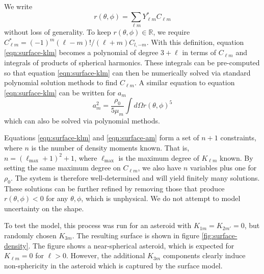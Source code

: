 \documentclass[fleqn,usenatbib]{mnras}
\begin{document}
We write 
\begin{equation}
  r(\theta, \phi) = \sum_{\ell m} Y_{\ell m}^* C_{\ell m}
\end{equation}
without loss of generality. To keep $r(\theta, \phi) \in \mathds{R}$, we require $C_{\ell m}^* = (-1)^m (\ell-m)!/(\ell+m) C_{l,-m}$. With this definition, equation \ref{eqn:surface-klm} becomes a polynomial of degree $3+\ell$ in terms of $C_{\ell m}$ and integrals of products of spherical harmonics. These integrals can be pre-computed so that equation \ref{eqn:surface-klm} can then be numerically solved via standard polynomial solution methods to find $C_{\ell m}$. A similar equation to equation \ref{eqn:surface-klm} can be written for $a_m$
\begin{equation}
  a_m^2 = \frac{\rho_0}{5\mu_m}\int d\Omega r(\theta, \phi)^5
  \label{eqn:surface-am}
\end{equation}
which can also be solved via polynomial methods.

Equations \ref{eqn:surface-klm} and \ref{eqn:surface-am} form a set of $n+1$ constraints, where $n$ is the number of density moments known. That is, $n=(\ell_\text{max}+1)^2+1$, where $\ell_\text{max}$ is the maximum degree of $K_{\ell m}$ known. By setting the same maximum degree on $C_{\ell m}$, we also have $n$ variables plus one for $\rho_0$. The system is therefore well-determined and will yield finitely many solutions. These solutions can be further refined by removing those that produce $r(\theta, \phi) < 0$ for any $\theta, \phi$, which is unphysical. We do not attempt to model uncertainty on the shape.

To test the model, this process was run for an asteroid with $K_{1m}=K_{2m'}=0$, but randomly chosen $K_{3m}$. The resulting surface is shown in figure \ref{fig:surface-density}. The figure shows a near-spherical asteroid, which is expected for $K_{\ell m} = 0$ for $\ell > 0$. However, the additional $K_{3m}$ components clearly induce non-sphericity in the asteroid which is captured by the surface model.
\end{document}
